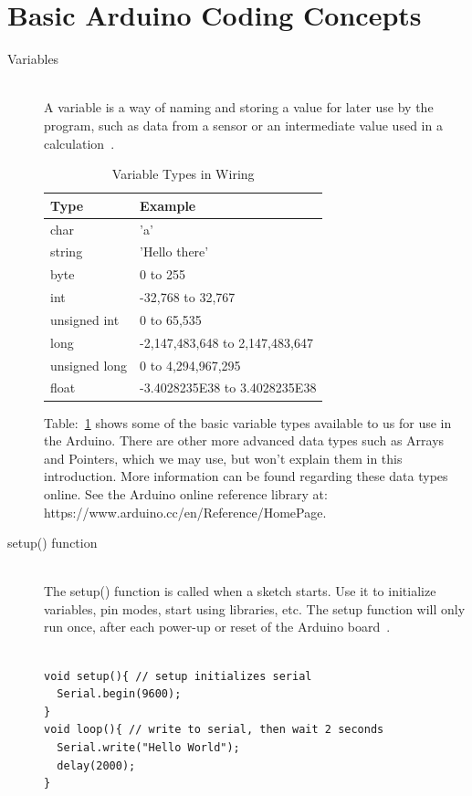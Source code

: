 \newpage
\section*{Basic Arduino Coding Concepts}


\begin{description}
	\item[Variables] \hfill \\
	A variable is a way of naming and storing a value for later use by the program, such as data from a sensor or an intermediate value used in a calculation~\citep{arduino-15-b}.
	\begin{table}
		\centering
		\begin{tabular}{p{4cm} l}
			\toprule
			Type & Example\\ \midrule
			char & 'a' \\
			string & 'Hello there' \\
			byte & 0 to 255 \\
			int & -32,768 to 32,767 \\
			unsigned int & 0 to 65,535 \\
			long & -2,147,483,648 to 2,147,483,647 \\
			unsigned long & 0 to 4,294,967,295 \\
			float & -3.4028235E38 to 3.4028235E38 \\
			\bottomrule
		\end{tabular}
		\caption{Variable Types in Wiring}
		\label{tab:wiring_variable_types}
	\end{table}
	Table:~\ref{tab:wiring_variable_types} shows some of the basic variable types available to us for use in the Arduino. There are other more advanced data types such as Arrays and Pointers, which we may use, but won't explain them in this introduction. More information can be found regarding these data types online. See the Arduino online reference library at: https://www.arduino.cc/en/Reference/HomePage.
	
	\item[setup() function] \hfill \\
	The setup() function is called when a sketch starts. Use it to initialize variables, pin modes, start using libraries, etc. The setup function will only run once, after each power-up or reset of the Arduino board~\citep{arduino-15-c}.
	\begin{lstlisting}

void setup(){ // setup initializes serial
  Serial.begin(9600);
}
void loop(){ // write to serial, then wait 2 seconds
  Serial.write("Hello World");
  delay(2000);
}
	\end{lstlisting}


\end{description}
